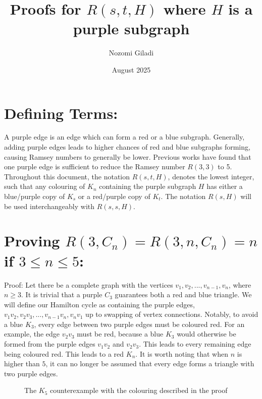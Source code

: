 \documentclass{article}
\title{Proofs for $R(s,t,H)$ where $H$ is a purple subgraph}
\date{August 2025}
\author{Nozomi Giladi}
\begin{document}
\maketitle
\section{Defining Terms:}
A purple edge is an edge which can form a red or a blue subgraph. Generally, adding purple edges leads to higher chances of red and blue subgraphs forming, causing Ramsey numbers to generally be lower. Previous works have found that one purple edge is sufficient to reduce the Ramsey number $R(3,3)$ to 5. Throughout this document, the notation $R(s,t,H)$, denotes the lowest integer, such that any colouring of $K_n$ containing the purple subgraph $H$ has either a blue/purple copy of $K_s$ or a red/purple copy of $K_t$. The notation $R(s,H)$ will be used interchangeably with $R(s,s,H)$.

\section{Proving $R(3,C_n)=R(3,n,C_n) = n$ if $3\leq n\leq5$:}
Proof:
Let there be a complete graph with the vertices $v_1,v_2,...,v_{n-1},v_n$, where $n\geq3$. It is trivial that a purple $C_3$ guarantees both a red and blue triangle. We will define our Hamilton cycle as containing the purple edges, $v_1v_2,v_2v_3,...,v_{n-1}v_n, v_nv_1$ up to swapping of vertex connections. Notably, to avoid a blue $K_3$, every edge between two purple edges must be coloured red. For an example, the edge $v_2v_3$ must be red, because a blue $K_3$ would otherwise be formed from the purple edges $v_1v_2$ and $v_2v_3$. This leads to every remaining edge being coloured red. This leads to a red $K_n$. It is worth noting that when $n$ is higher than $5$, it can no longer be assumed that every edge forms a triangle with two purple edges.
\begin{figure}[h!]
\centering
{}
\caption{The $K_5$ counterexample with the colouring described in the proof}
\end{figure}
\end{document}
